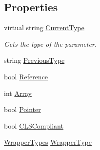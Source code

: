 \subsection*{Properties}
\begin{DoxyCompactItemize}
\item 
virtual string \hyperlink{class_bind_1_1_structures_1_1_type_ae54c82fec549fa18561c2ff88d5615ca}{CurrentType}
\begin{DoxyCompactList}\small\item\em Gets the type of the parameter. \item\end{DoxyCompactList}\item 
string \hyperlink{class_bind_1_1_structures_1_1_type_a8a6b3be164b6158f5c311d8773090e04}{PreviousType}
\item 
bool \hyperlink{class_bind_1_1_structures_1_1_type_a3f865bbf68cda2cc1fe04a839199fae5}{Reference}
\item 
int \hyperlink{class_bind_1_1_structures_1_1_type_a8446ccbe46981c6c1aa540b1151f8be2}{Array}
\item 
bool \hyperlink{class_bind_1_1_structures_1_1_type_ac600f3673145b81982f0f75b6e2f4e2e}{Pointer}
\item 
bool \hyperlink{class_bind_1_1_structures_1_1_type_a15f810ed11402d3b4dbd44ab338013c0}{CLSCompliant}
\item 
\hyperlink{namespace_bind_a84806c2a8584c294f366e3b50609f0bd}{WrapperTypes} \hyperlink{class_bind_1_1_structures_1_1_type_aa4fd10332910b07134294165107a741e}{WrapperType}
\end{DoxyCompactItemize}


